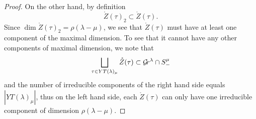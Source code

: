\documentclass[draft]{article} %
\begin{document}
\begin{proof}
On the other hand, by definition 
$$
\mathring Z(\tau)_2 \subset \mathring Z(\tau). %
$$
Since $ \dim \mathring Z(\tau)_2 = \rho(\lambda - \mu)$, we see that $ \mathring Z(\tau) $ must have at least one component of the maximal dimension.  To see that it cannot have any other components of maximal dimension, we note that
$$ \bigsqcup_{\tau \in YT(\lambda)_\mu} \mathring Z(\tau) \subset \mathcal{G}\!r^\lambda \cap S_-^\mu$$
and the number of irreducible components of the right hand side 
equals $|YT(\lambda)_\mu|$, thus on the left hand side, each $ \mathring Z(\tau)$ can only have one irreducible component of dimension $ \rho(\lambda - \mu)$.
% 
% 
\end{proof}
% 

% 
% 
% 
% 

% 
% 
% 
\end{document}
